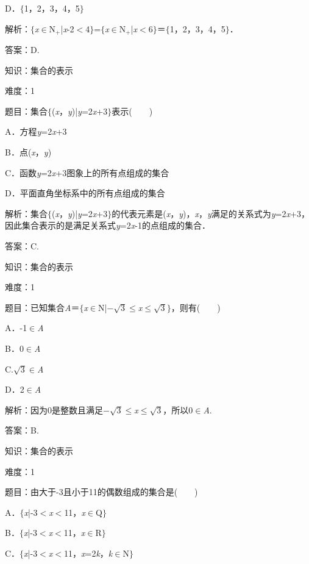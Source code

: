\documentclass{article} %
\begin{document}
D．$\mathrm{\{}$1，2，3，4，5$\mathrm{\}}$

解析：$\mathrm{\{}$\textit{x}$\mathrm{\in}$N${}_{\textrm{+}}$|\textit{x}-2$\mathrm{<}$4$\mathrm{\}}$=$\mathrm{\{}$\textit{x}$\mathrm{\in}$N${}_{\textrm{+}}$|\textit{x}$\mathrm{<}$6$\mathrm{\}}$＝$\mathrm{\{}$1，2，3，4，5$\mathrm{\}}$．

答案：D.

知识：集合的表示

难度：1

题目：集合$\mathrm{\{}$(\textit{x}，\textit{y})|\textit{y}=2\textit{x}+3$\mathrm{\}}$表示(　　)

A．方程\textit{y}=2\textit{x}+3

B．点(\textit{x}，\textit{y})

C．函数\textit{y}=2\textit{x}+3图象上的所有点组成的集合

D．平面直角坐标系中的所有点组成的集合

解析：集合$\mathrm{\{}$(\textit{x}，\textit{y})|\textit{y}=2\textit{x}+3$\mathrm{\}}$的代表元素是(\textit{x}，\textit{y})，\textit{x}，\textit{y}满足的关系式为\textit{y}=2\textit{x}+3，因此集合表示的是满足关系式\textit{y}=2\textit{x}-1的点组成的集合．

答案：C.

知识：集合的表示

难度：1

题目：已知集合\textit{A}＝$\mathrm{\{}$\textit{x}$\mathrm{\in}$N|$-\sqrt{3}\mathrm{\le}$\textit{x}$\mathrm{\le}\sqrt{3}\mathrm{\}}$，则有(　　)

A．-1$\mathrm{\in}$\textit{A} 

B．0$\mathrm{\in}$\textit{A}

C.$\sqrt{3}\mathrm{\in}$\textit{A}   

D．2$\mathrm{\in}$\textit{A}

解析：因为0是整数且满足$-\sqrt{3}\mathrm{\le}$\textit{x}$\mathrm{\le}\sqrt{3}$，所以0$\mathrm{\in}$\textit{A}.

答案：B.

知识：集合的表示

难度：1

题目：由大于-3且小于11的偶数组成的集合是(　　)

A．$\mathrm{\{}$\textit{x}|-3$\mathrm{<}$\textit{x}$\mathrm{<}$11，\textit{x}$\mathrm{\in}$Q$\mathrm{\}}$

B．$\mathrm{\{}$\textit{x}|-3$\mathrm{<}$\textit{x}$\mathrm{<}$11，\textit{x}$\mathrm{\in}$R$\mathrm{\}}$

C．$\mathrm{\{}$\textit{x}|-3$\mathrm{<}$\textit{x}$\mathrm{<}$11，\textit{x}=2\textit{k}，\textit{k}$\mathrm{\in}$N$\mathrm{\}}$
\end{document}

